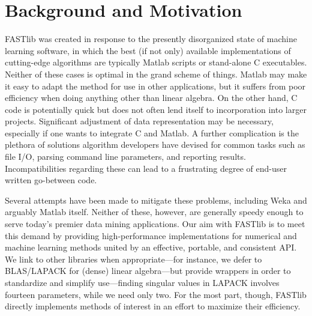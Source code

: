 \documentclass[letter]{report}
\begin{document}
\section {Background and Motivation}
FASTlib was created in response to the presently disorganized state of
machine learning software, in which the best (if not only) available
implementations of cutting-edge algorithms are typically Matlab
scripts or stand-alone C executables.  Neither of these cases is
optimal in the grand scheme of things.  Matlab may make it easy to
adapt the method for use in other applications, but it suffers from
poor efficiency when doing anything other than linear algebra.  On the
other hand, C code is potentially quick but does not often lend itself
to incorporation into larger projects.  Significant adjustment of data
representation may be necessary, especially if one wants to integrate
C and Matlab.  A further complication is the plethora of solutions
algorithm developers have devised for common tasks such as file I/O,
parsing command line parameters, and reporting results.
Incompatibilities regarding these can lead to a frustrating degree of
end-user written go-between code.

Several attempts have been made to mitigate these problems, including
Weka and arguably Matlab itself.  Neither of these, however, are
generally speedy enough to serve today's premier data mining
applications.  Our aim with FASTlib is to meet this demand by
providing high-performance implementations for numerical and machine
learning methods united by an effective, portable, and consistent API.
We link to other libraries when appropriate---for instance, we defer to
BLAS/LAPACK for (dense) linear algebra---but provide wrappers in order
to standardize and simplify use---finding singular values in LAPACK
involves fourteen parameters, while we need only two.  For the most
part, though, FASTlib directly implements methods of interest in an
effort to maximize their efficiency.
\end{document}

